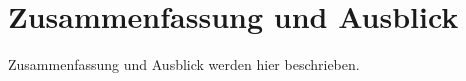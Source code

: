 \chapter{Zusammenfassung und Ausblick}\label{ch:ch4}
Zusammenfassung und Ausblick werden hier beschrieben.